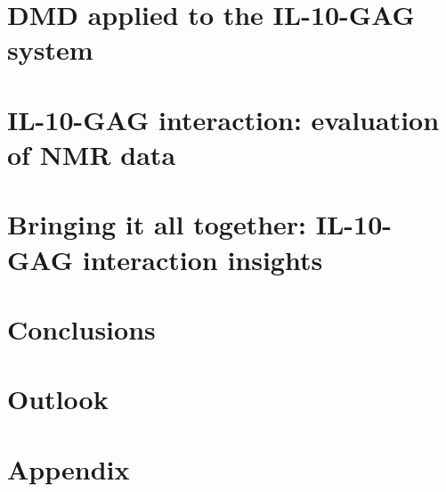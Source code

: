 \chapter{DMD applied to the IL-10-GAG system}
\lipsum[1-10]

\chapter{IL-10-GAG interaction: evaluation of NMR data}
\lipsum[1-10]

\chapter{Bringing it all together: IL-10-GAG interaction insights}
\lipsum[1-10]

\chapter{Conclusions}
\lipsum[1-10]

\chapter{Outlook}
\lipsum[1-10]

\backmatter

%



\chapter{Appendix}


